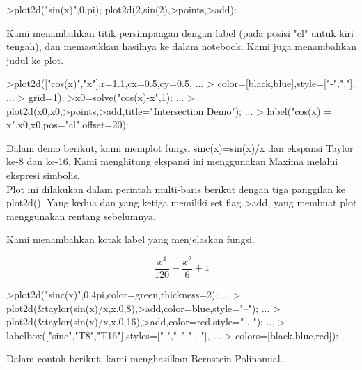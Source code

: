 \documentclass{article}
\begin{document}
\begin{eulernotebook}
\begin{eulercomment}
\begin{eulercomment}
\begin{eulercomment}
\begin{eulercomment}
\begin{eulerprompt}
>plot2d("sin(x)",0,pi); plot2d(2,sin(2),>points,>add):
\end{eulerprompt}
\begin{eulercomment}
Kami menambahkan titik persimpangan dengan label (pada posisi "cl"
untuk kiri tengah), dan memasukkan hasilnya ke dalam notebook. Kami
juga menambahkan judul ke plot.
\end{eulercomment}
\begin{eulerprompt}
>plot2d(["cos(x)","x"],r=1.1,cx=0.5,cy=0.5, ...
>  color=[black,blue],style=["-","."], ...
>  grid=1);
>x0=solve("cos(x)-x",1);  ...
>  plot2d(x0,x0,>points,>add,title="Intersection Demo");  ...
>  label("cos(x) = x",x0,x0,pos="cl",offset=20):
\end{eulerprompt}
\begin{eulercomment}
Dalam demo berikut, kami memplot fungsi sinc(x)=sin(x)/x dan ekspansi
Taylor ke-8 dan ke-16. Kami menghitung ekspansi ini menggunakan Maxima
melalui ekspresi simbolis.\\
Plot ini dilakukan dalam perintah multi-baris berikut dengan tiga
panggilan ke plot2d(). Yang kedua dan yang ketiga memiliki set flag
\textgreater{}add, yang membuat plot menggunakan rentang sebelumnya.

Kami menambahkan kotak label yang menjelaskan fungsi.
\end{eulercomment}
\begin{eulerformula}
\[
\frac{x^4}{120}-\frac{x^2}{6}+1
\]
\end{eulerformula}
\begin{eulerprompt}
>plot2d("sinc(x)",0,4pi,color=green,thickness=2); ...
>  plot2d(&taylor(sin(x)/x,x,0,8),>add,color=blue,style="--"); ...
>  plot2d(&taylor(sin(x)/x,x,0,16),>add,color=red,style="-.-"); ...
>  labelbox(["sinc","T8","T16"],styles=["-","--","-.-"], ...
>    colors=[black,blue,red]):
\end{eulerprompt}
\begin{eulercomment}
Dalam contoh berikut, kami menghasilkan Bernstein-Polinomial.


\end{eulercomment}
\end{eulercomment}
\end{eulercomment}
\end{eulercomment}
\end{eulercomment}
\end{eulernotebook}
\end{document}
